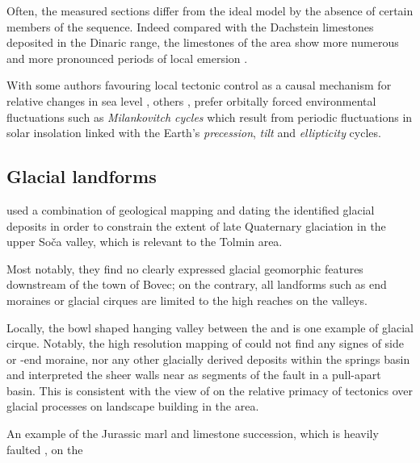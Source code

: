 Often, the measured sections differ from the ideal model by the absence of certain members of the sequence. Indeed compared with the Dachstein limestones deposited in the Dinaric range, the limestones of the  area show more numerous and more pronounced periods of local emersion \citep{ogorelec1996dachstein}.

 With some authors favouring local tectonic control as a causal mechanism  for relative changes in sea level \citep{goldhammer1990depositional,enos1998lofer}, others \citep{fisher1964lofer,balog1997shallow,haas2004characteristics,doi:10.1130/G21578.1}, prefer orbitally forced environmental fluctuations such as \emph{Milankovitch cycles} which result from periodic fluctuations in solar insolation linked with the Earth's \emph{precession}, \emph{tilt} and \emph{ellipticity} cycles. 

 \subsection{Glacial landforms}
 \citet{bavec2004late} used a combination of geological mapping and dating the identified glacial deposits in order to constrain the extent of late Quaternary glaciation in the upper So\v{c}a valley, which is relevant to the Tolmin area.

 Most notably, they find no clearly expressed glacial geomorphic features downstream of the town of Bovec; on the contrary, all landforms such as end moraines or glacial cirques are limited to the high reaches on the valleys. 

Locally, the bowl shaped hanging valley between the  and  is one example of glacial cirque. Notably, the high resolution mapping of \citet{cunningham2006application} could not find any signes of side or -end moraine, nor any other glacially derived deposits within the  springs basin and interpreted the sheer walls near  as segments of the  fault in a pull-apart basin. 
This is consistent with the view of \citet{vsmuc2009tectonic} on the relative primacy of tectonics over glacial processes on landscape building in the  area.

\begin{marginfigure}
\checkoddpage \ifoddpage \forcerectofloat \else \forceversofloat \fi
\centering

 \caption{An example of the Jurassic marl and limestone succession, which is heavily faulted , on the \protect{}}
 \label{fig:limestones and marls}
\end{marginfigure}



